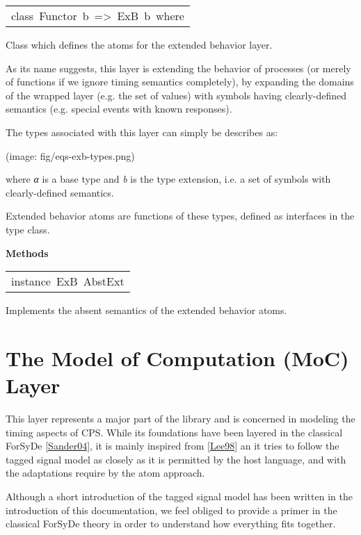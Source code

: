 \begin{haddockdesc}
\item[\begin{tabular}{@{}l}
class\ Functor\ b\ =>\ ExB\ b\ where
\end{tabular}]\haddockbegindoc
Class which defines the atoms for the extended behavior layer.\par
As its name suggests, this layer is extending the behavior of
 processes (or merely of functions if we ignore timing semantics
 completely), by expanding the domains of the wrapped layer
 (e.g. the set of values) with symbols having clearly-defined
 semantics (e.g. special events with known responses).\par
The types associated with this layer can simply be describes as:\par
(image: fig/eqs-exb-types.png)\par
where  \emph{α} is a base type and \emph{b} is the type extension,
 i.e. a set of symbols with clearly-defined semantics.\par
Extended behavior atoms are functions of these types, defined as
 interfaces in the  type class.\par

\haddockpremethods{}\textbf{Methods}
\end{haddockdesc}
\begin{haddockdesc}
\item[\begin{tabular}{@{}l}
instance\ ExB\ AbstExt
\end{tabular}]\haddockbegindoc
Implements the absent semantics of the extended behavior atoms.\par

\end{haddockdesc}
\section{The Model of Computation (MoC) Layer}
This layer represents a major part of the 
 library and is concerned in modeling the timing aspects of
 CPS. While its foundations have been layered in the classical
 ForSyDe \href{#sander04}{[Sander04]}, it is mainly inspired from
 \href{#lee98}{[Lee98]} an it tries to follow the tagged signal model as
 closely as it is permitted by the host language, and with the
 adaptations require by the atom approach.\par
Although a short introduction of the tagged signal model has been
 written in the introduction of this documentation, we feel
 obliged to provide a primer in the classical ForSyDe theory in
 order to understand how everything fits together.\par

